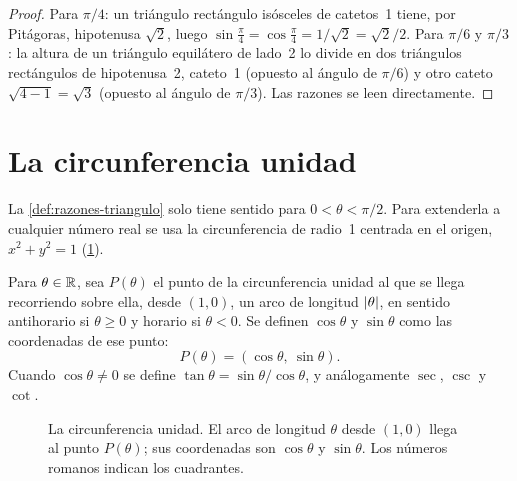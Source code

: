 \begin{proof}
Para $\pi/4$: un triángulo rectángulo isósceles de catetos~1 tiene, por Pitágoras, hipotenusa $\sqrt2$, luego $\sin\frac{\pi}{4}=\cos\frac{\pi}{4}=1/\sqrt2=\sqrt2/2$. Para $\pi/6$ y $\pi/3$: la altura de un triángulo equilátero de lado~2 lo divide en dos triángulos rectángulos de hipotenusa~2, cateto~1 (opuesto al ángulo de $\pi/6$) y otro cateto $\sqrt{4-1}=\sqrt3$ (opuesto al ángulo de $\pi/3$). Las razones se leen directamente.
\end{proof}

\section{La circunferencia unidad}

La \cref{def:razones-triangulo} solo tiene sentido para $0<\theta<\pi/2$. Para extenderla a cualquier número real se usa la circunferencia de radio~1 centrada en el origen, $x^{2}+y^{2}=1$ (\cref{fig:circunferencia}).

\begin{definicion}\label{def:circunferencia}
Para $\theta\in\mathbb{R}$, sea $P(\theta)$ el punto de la circunferencia unidad al que se llega recorriendo sobre ella, desde $(1,0)$, un arco de longitud $\lvert\theta\rvert$, en sentido antihorario si $\theta\ge 0$ y horario si $\theta<0$. Se definen $\cos\theta$ y $\sin\theta$ como las coordenadas de ese punto:
\[
P(\theta)=(\cos\theta,\ \sin\theta).
\]
Cuando $\cos\theta\neq 0$ se define $\tan\theta=\sin\theta/\cos\theta$, y análogamente $\sec$, $\csc$ y $\cot$.
\end{definicion}

\begin{figure}[ht]
\centering
{}
\caption{La circunferencia unidad. El arco de longitud $\theta$ desde $(1,0)$ llega al punto $P(\theta)$; sus coordenadas son $\cos\theta$ y $\sin\theta$. Los números romanos indican los cuadrantes.}
\label{fig:circunferencia}
\end{figure}

